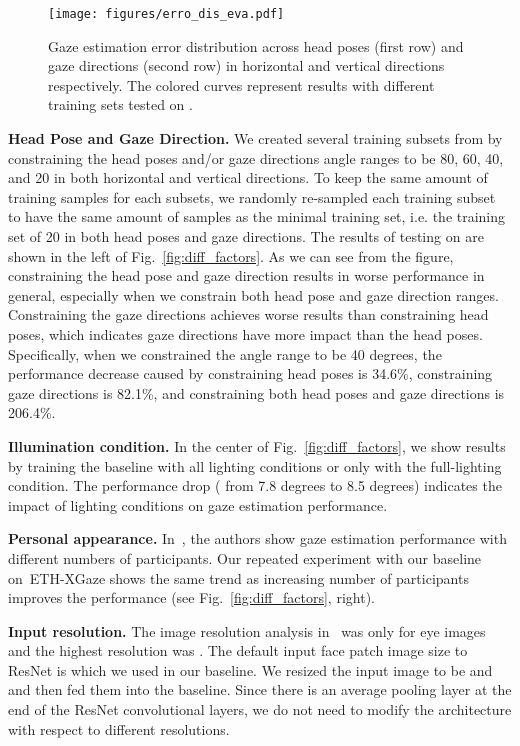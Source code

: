 \documentclass[runningheads]{llncs}
\newcommand{\datasetname}{ETH-XGaze\xspace}
\begin{document}
\begin{figure}[t]
    \centering
    \texttt{[image: figures/erro\_dis\_eva.pdf]}
    \caption{Gaze estimation error distribution across head poses (first row) and gaze directions (second row) in horizontal and vertical directions respectively. The colored curves represent results with different training sets tested on .}
    \label{fig:error_dis_eva}
\end{figure}

\textbf{Head Pose and Gaze Direction.} We created several training subsets from  by constraining the head poses and/or gaze directions angle ranges to be 80, 60, 40, and 20 in both horizontal and vertical directions.
To keep the same amount of training samples for each subsets, we randomly re-sampled each training subset to have the same amount of samples as the minimal training set, i.e. the training set of 20 in both head poses and gaze directions.
The results of testing on  are shown in the left of Fig.~\ref{fig:diff_factors}.
As we can see from the figure, constraining the head pose and gaze direction results in worse performance in general, especially when we constrain both head pose and gaze direction ranges.
Constraining the gaze directions achieves worse results than constraining head poses, which indicates gaze directions have more impact than the head poses.
Specifically, when we constrained the angle range to be 40 degrees, the performance decrease caused by constraining head poses is 34.6\%, constraining gaze directions is 82.1\%, and constraining both head poses and gaze directions is 206.4\%.


\textbf{Illumination condition.} In the center of Fig.~\ref{fig:diff_factors}, we show results by training the baseline with all lighting conditions or only with the full-lighting condition.
The performance drop ( from 7.8 degrees to 8.5 degrees) indicates the impact of lighting conditions on gaze estimation performance.

\textbf{Personal appearance.} In~\cite{krafka2016eye}, the authors show gaze estimation performance with different numbers of participants.
Our repeated experiment with our baseline on~\datasetname shows the same trend as increasing number of participants improves the performance (see Fig.~\ref{fig:diff_factors}, right).

\textbf{Input resolution.} 
The image resolution analysis in~\cite{zhang2019mpiigaze} was only for eye images and the highest resolution was .
The default input face patch image size to ResNet is  which we used in our baseline.
We resized the input image to be  and  and then fed them into the baseline.
Since there is an average pooling layer at the end of the ResNet convolutional layers, we do not need to modify the architecture with respect to different resolutions.
\end{document}
